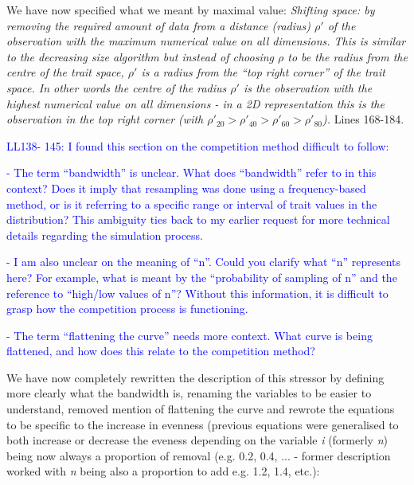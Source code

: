 \documentclass[
]{article}
\begin{document}
We have now specified what we meant by maximal value:
\textit{Shifting space: by removing the required amount of data from a distance (radius) $\rho'$ of the observation with the maximum numerical value on all dimensions.
This is similar to the decreasing size algorithm but instead of choosing $\rho$ to be the radius from the centre of the trait space, $\rho'$ is a radius from the ``top right corner'' of the trait space.
In other words the centre of the radius $\rho'$ is the observation with the highest numerical value on all dimensions - in a 2D representation this is the observation in the top right corner (with $\rho'_{20} > \rho'_{40} > \rho'_{60} > \rho'_{80}$).}
Lines 168-184.

\textcolor{blue}{LL138- 145: I found this section on the competition method difficult to follow:}

\textcolor{blue}{- The term ``bandwidth'' is unclear.
What does ``bandwidth'' refer to in this context? Does it imply that resampling was done using a frequency-based method, or is it referring to a specific range or interval of trait values in the distribution? This ambiguity ties back to my earlier request for more technical details regarding the simulation process.}

\textcolor{blue}{- I am also unclear on the meaning of ``n''.
Could you clarify what ``n'' represents here? For example, what is meant by the ``probability of sampling of n'' and the reference to ``high/low values of n''? Without this information, it is difficult to grasp how the competition process is functioning.}

\textcolor{blue}{- The term ``flattening the curve'' needs more context.
What curve is being flattened, and how does this relate to the competition method?}

We have now completely rewritten the description of this stressor by defining more clearly what the bandwidth is, renaming the variables to be easier to understand, removed mention of flattening the curve and rewrote the equations to be specific to the increase in evenness (previous equations were generalised to both increase or decrease the eveness depending on the variable \textit{i} (formerly \textit{n}) being now always a proportion of removal (e.g. 0.2, 0.4, ... - former description worked with \textit{n} being also a proportion to add e.g. 1.2, 1.4, etc.):
\end{document}

